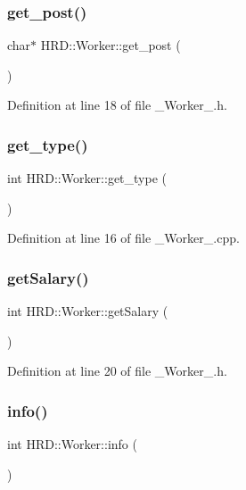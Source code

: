 \subsubsection{get\+\_\+post()}
{\footnotesize\ttfamily char$\ast$ H\+R\+D\+::\+Worker\+::get\+\_\+post (\begin{DoxyParamCaption}{ }\end{DoxyParamCaption})\hspace{0.3cm}{\ttfamily [inline]}}



Definition at line 18 of file \+\_\+\+Worker\+\_\+.\+h.

\mbox{\label{class_h_r_d_1_1_worker_a36d91b12e9921bd9b0c3a00bb1dde041}} 
\subsubsection{get\+\_\+type()}
{\footnotesize\ttfamily int H\+R\+D\+::\+Worker\+::get\+\_\+type (\begin{DoxyParamCaption}{ }\end{DoxyParamCaption})}



Definition at line 16 of file \+\_\+\+Worker\+\_\+.\+cpp.

\mbox{\label{class_h_r_d_1_1_worker_a517416984f3a6b7632fa484dfc8f950f}} 
\subsubsection{get\+Salary()}
{\footnotesize\ttfamily int H\+R\+D\+::\+Worker\+::get\+Salary (\begin{DoxyParamCaption}{ }\end{DoxyParamCaption})\hspace{0.3cm}{\ttfamily [inline]}}



Definition at line 20 of file \+\_\+\+Worker\+\_\+.\+h.

\mbox{\label{class_h_r_d_1_1_worker_a0a1c1ddb9f1b89ad00e22f09b0004e34}} 
\subsubsection{info()}
{\footnotesize\ttfamily int H\+R\+D\+::\+Worker\+::info (\begin{DoxyParamCaption}{ }\end{DoxyParamCaption})}



